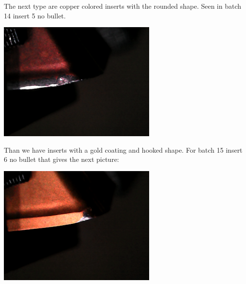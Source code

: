 \documentclass{scrartcl}
\begin{document}
The next type are copper colored inserts with the rounded shape. Seen in batch 14 insert 5 no bullet.

\includegraphics[width=3.125000in, keepaspectratio=true]{./2_Spaghetti_dataset/rounded_copper_b_014_p_005_l_006-011_white_nb.png}



Than we have inserts with a gold coating and hooked shape. For batch 15 insert 6 no bullet that gives the next picture:

\includegraphics[width=3.125000in, keepaspectratio=true]{./2_Spaghetti_dataset/rounded_gold_b_015_p_006_l_006-011_white_nb.png}
\end{document}
